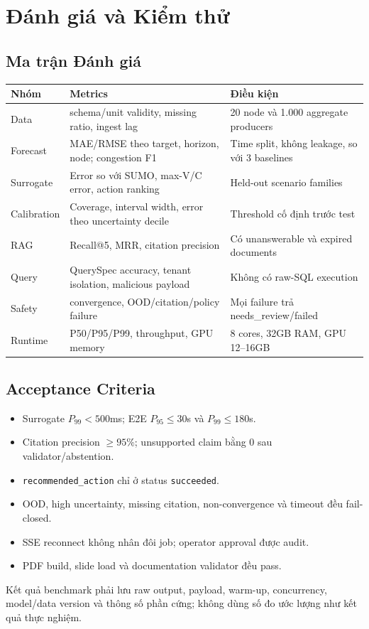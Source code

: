 \chapter{Đánh giá và Kiểm thử}

\section{Ma trận Đánh giá}

\begin{longtable}{p{3.5cm} p{5cm} p{5cm}}
\toprule
\textbf{Nhóm} & \textbf{Metrics} & \textbf{Điều kiện} \\
\midrule
Data & schema/unit validity, missing ratio, ingest lag & 20 node và 1.000 aggregate producers \\
Forecast & MAE/RMSE theo target, horizon, node; congestion F1 & Time split, không leakage, so với 3 baselines \\
Surrogate & Error so với SUMO, max-V/C error, action ranking & Held-out scenario families \\
Calibration & Coverage, interval width, error theo uncertainty decile & Threshold cố định trước test \\
RAG & Recall@5, MRR, citation precision & Có unanswerable và expired documents \\
Query & QuerySpec accuracy, tenant isolation, malicious payload & Không có raw-SQL execution \\
Safety & convergence, OOD/citation/policy failure & Mọi failure trả needs\_review/failed \\
Runtime & P50/P95/P99, throughput, GPU memory & 8 cores, 32GB RAM, GPU 12--16GB \\
\bottomrule
\end{longtable}

\section{Acceptance Criteria}

\begin{itemize}
  \item Surrogate $P_{99}<500$ms; E2E $P_{95}\leq30$s và $P_{99}\leq180$s.
  \item Citation precision $\geq95\%$; unsupported claim bằng 0 sau validator/abstention.
  \item \texttt{recommended\_action} chỉ ở status \texttt{succeeded}.
  \item OOD, high uncertainty, missing citation, non-convergence và timeout đều fail-closed.
  \item SSE reconnect không nhân đôi job; operator approval được audit.
  \item PDF build, slide load và documentation validator đều pass.
\end{itemize}

Kết quả benchmark phải lưu raw output, payload, warm-up, concurrency, model/data version và thông số phần cứng; không dùng số đo ước lượng như kết quả thực nghiệm.

